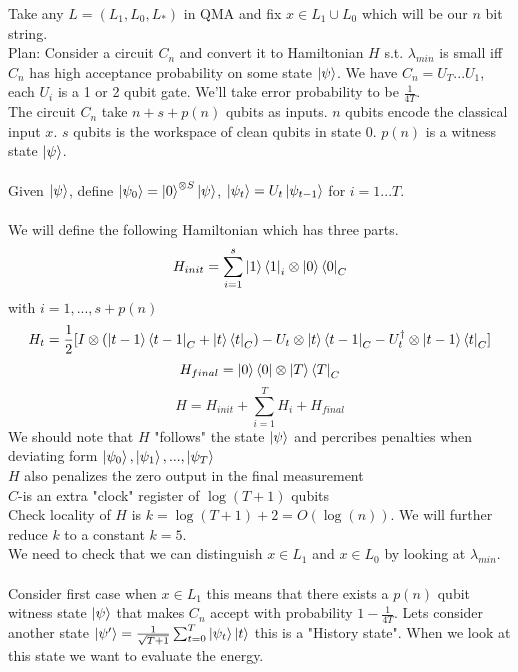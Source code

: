 \documentclass{article}
\begin{document}
                       Take any $L= (L_1, L_0, L_*)$ in QMA and fix $x \in L_1 \cup L_0$ which will be our $n$ bit string.\\
                       Plan: Consider a circuit $C_n$ and convert it to Hamiltonian $H$ s.t. $\lambda_{min}$ is small iff $C_n$ has high acceptance probability on some state $\ket{\psi}$. We have $C_n = U_T...U_1$, each $U_i$ is a 1 or 2 qubit gate. We'll take error probability to be $\frac{1}{4T}$. \\
                       The circuit $C_n$ take $n+s+ p(n)$ qubits as inputs. $n$ qubits encode the classical input $x$. $s$ qubits is the workspace of clean qubits in state $0$. $p(n)$ is a witness state $\ket{\psi}$.\\\\
                       Given $\ket{\psi}$, define $\ket{\psi_0} = \ket{0}^{\otimes S}\ket{\psi}$, $\ket{\psi_t} = U_t \ket{\psi_{t-1}}$ for $i = 1...T$. \\\\
                       We will define the following Hamiltonian which has three parts. $$H_{init} = \sum_{i=1}^s \ket{1} \bra{1}_i \otimes \ket{0} \bra{0}_C$$
                       with $i = 1, ..., s+p(n)$
                       $$
                       H_t = \frac{1}{2} [ I \otimes ( \ket{t-1} \bra{t-1}_C + \ket{t}\bra{t}_C) - U_t \otimes \ket{t} \bra{t-1}_C - U_t^{\dagger} \otimes \ket{t-1} \bra{t}_C]
                       $$
                       $$
                       H_{final} = \ket{0} \bra{0} \otimes \ket{T} \bra{T}_C
                       $$
                       $$H= H_{init} + \sum_{i=1}^T H_i + H_{final}$$
                       We should note that $H$ "follows" the state $\ket{\psi}$ and percribes penalties when deviating form $\ket{\psi_0}, \ket{\psi_1},..., \ket{\psi_T}$\\
                       $H$ also penalizes the zero output in the final measurement\\
                       $C$-is an extra "clock" register of $\log (T+1)$ qubits\\
                       Check locality of $H$ is $k= \log (T+1) + 2 = O(\log (n))$. We will further reduce $k$ to a constant $k = 5$.\\
                       We need to check that we can distinguish $x\in L_1$ and $x \in L_0$ by looking at $\lambda_{min}$. \\\\
                       Consider first case when $x \in L_1$ this means that there exists a $p(n)$ qubit witness state $\ket{\psi}$ that makes $C_n$ accept with probability $1- \frac{1}{4T}$. Lets consider another state $\ket{\psi'} = \frac{1}{\sqrt{T+1}} \sum_{t = 0}^T \ket{\psi_t} \ket{t}$ this is a "History state". When we look at this state we want to evaluate the energy.
\end{document}
